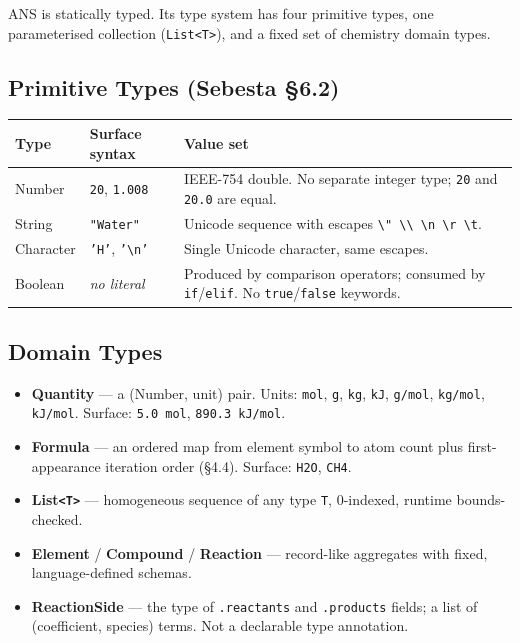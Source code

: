 \documentclass[11pt,a4paper]{article}
\newcommand{\code}[1]{\texttt{#1}}
\begin{document}
ANS is statically typed. Its type system has four primitive types, one parameterised collection (\code{List<T>}), and a fixed set of chemistry domain types.

\subsection{Primitive Types (Sebesta \S6.2)}

\begin{tabularx}{\textwidth}{@{} L{2.1cm} L{2.2cm} Y @{}}
\toprule
\textbf{Type} & \textbf{Surface syntax} & \textbf{Value set} \\
\midrule
Number   & \code{20}, \code{1.008} & IEEE-754 double. No separate integer type; \code{20} and \code{20.0} are equal. \\
String   & \code{"Water"}          & Unicode sequence with escapes \texttt{\textbackslash" \textbackslash\textbackslash\ \textbackslash n \textbackslash r \textbackslash t}. \\
Character& \code{'H'}, \code{'\textbackslash{}n'} & Single Unicode character, same escapes. \\
Boolean  & \textit{no literal}     & Produced by comparison operators; consumed by \code{if}/\code{elif}. No \code{true}/\code{false} keywords. \\
\bottomrule
\end{tabularx}

\subsection{Domain Types}

\begin{itemize}
\item \textbf{Quantity} --- a (Number, unit) pair. Units: \code{mol}, \code{g}, \code{kg}, \code{kJ}, \code{g/mol}, \code{kg/mol}, \code{kJ/mol}. Surface: \code{5.0 mol}, \code{890.3 kJ/mol}.
\item \textbf{Formula} --- an ordered map from element symbol to atom count plus first-appearance iteration order (\S4.4). Surface: \code{H2O}, \code{CH4}.
\item \textbf{List\texttt{<T>}} --- homogeneous sequence of any type \code{T}, 0-indexed, runtime bounds-checked.
\item \textbf{Element} / \textbf{Compound} / \textbf{Reaction} --- record-like aggregates with fixed, language-defined schemas.
\item \textbf{ReactionSide} --- the type of \code{.reactants} and \code{.products} fields; a list of (coefficient, species) terms. Not a declarable type annotation.
\end{itemize}
\end{document}
